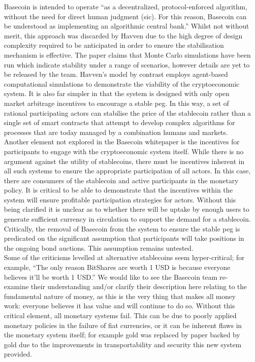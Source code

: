 \noindent Basecoin is intended to operate ``as a decentralized, protocol-enforced algorithm, without the need for direct human judgment (sic). For this reason, Basecoin can be understood as implementing an algorithmic central bank.'' Whilst not without merit, this approach was discarded by Havven due to the high degree of design complexity required to be anticipated in order to ensure the stabilisation mechanism is effective. The paper claims that Monte Carlo simulations have been run which indicate stability under a range of scenarios, however details are yet to be released by the team. Havven's model by contrast employs agent-based computational simulations to demonstrate the viability of the cryptoeconomic system. It is also far simpler in that the system is designed with only open market arbitrage incentives to encourage a stable peg. In this way, a set of rational participating actors can stabilise the price of the stablecoin rather than a single set of smart contracts that attempt to develop complex algorithms for processes that are today managed by a combination humans and markets. \\

\noindent Another element not explored in the Basecoin whitepaper is the incentives for participants to engage with the cryptoeconomic system itself. While there is no argument against the utility of stablecoins, there must be incentives inherent in all such systems to ensure the appropriate participation of all actors. In this case, there are consumers of the stablecoin and active participants in the monetary policy. It is critical to be able to demonstrate that the incentives within the system will ensure profitable participation strategies for actors. Without this being clarified it is unclear as to whether there will be uptake by enough users to generate sufficient currency in circulation to support the demand for a stablecoin. Critically, the removal of Basecoin from the system to ensure the stable peg is predicated on the significant assumption that participants will take positions in the ongoing bond auctions. This assumption remains untested. \\

\noindent Some of the criticisms levelled at alternative stablecoins seem hyper-critical; for example, ``The only reason BitShares are worth 1 USD is because everyone believes it’ll be worth 1 USD.'' We would like to see the Basecoin team re-examine their understanding and/or clarify their description here relating to the fundamental nature of money, as this is the very thing that makes all money work: everyone believes it has value and will continue to do so. Without this critical element, all monetary systems fail. This can be due to poorly applied monetary policies in the failure of fiat currencies, or it can be inherent flaws in the monetary system itself; for example gold was replaced by paper backed by gold due to the improvements in transportability and security this new system provided. \\

